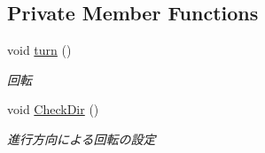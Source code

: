 \subsection*{Private Member Functions}
\begin{DoxyCompactItemize}
\item 
void \hyperlink{class_squid_a408d6a90277478bda51b518716531627}{turn} ()
\begin{DoxyCompactList}\small\item\em 回転 \end{DoxyCompactList}\item 
void \hyperlink{class_squid_a90e09dd2b8978f5a6f749078f2913ebe}{Check\+Dir} ()
\begin{DoxyCompactList}\small\item\em 進行方向による回転の設定 \end{DoxyCompactList}\end{DoxyCompactItemize}
